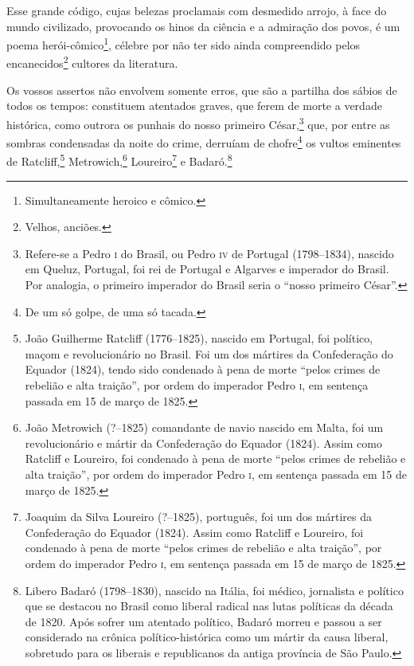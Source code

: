 Esse grande código, cujas belezas proclamais com desmedido arrojo, à
face do mundo civilizado, provocando os hinos da ciência e a admiração
dos povos, é um poema herói-cômico\footnote{Simultaneamente heroico e
  cômico.}, célebre por não ter sido ainda compreendido pelos
encanecidos\footnote{Velhos, anciões.} cultores da literatura.

Os vossos assertos não envolvem somente erros, que são a partilha dos
sábios de todos os tempos: constituem atentados graves, que ferem de
morte a verdade histórica, como outrora os punhais do nosso primeiro
César,\footnote{Refere-se a Pedro \textsc{i} do Brasil, ou Pedro \textsc{iv} de Portugal
  (1798--1834), nascido em Queluz, Portugal, foi rei de Portugal e
  Algarves e imperador do Brasil. Por analogia, o primeiro imperador do
  Brasil seria o ``nosso primeiro César''.} que, por entre as sombras
condensadas da noite do crime, derruíam de chofre\footnote{De um só
  golpe, de uma só tacada.} os vultos eminentes de Ratcliff,\footnote{
  João Guilherme Ratcliff (1776--1825), nascido em Portugal, foi
  político, maçom e revolucionário no Brasil. Foi um dos mártires da
  Confederação do Equador (1824), tendo sido condenado à pena de morte
  ``pelos crimes de rebelião e alta traição'', por ordem do imperador
  Pedro \textsc{i}, em sentença passada em 15 de março de 1825.\label{ratcliff}}
Metrowich,\footnote{João Metrowich (?--1825) comandante de navio
  nascido em Malta, foi um revolucionário e mártir da Confederação do
  Equador (1824). Assim como Ratcliff e Loureiro, foi condenado à pena
  de morte ``pelos crimes de rebelião e alta traição'', por ordem do
  imperador Pedro \textsc{i}, em sentença passada em 15 de março de 1825.}
Loureiro\footnote{Joaquim da Silva Loureiro (?--1825), português, foi
  um dos mártires da Confederação do Equador (1824). Assim como Ratcliff
  e Loureiro, foi condenado à pena de morte ``pelos crimes de rebelião e
  alta traição'', por ordem do imperador Pedro \textsc{i}, em sentença passada em
  15 de março de 1825.} e Badaró.\footnote{Libero Badaró (1798--1830),
  nascido na Itália, foi médico, jornalista e político que se destacou
  no Brasil como liberal radical nas lutas políticas da década de 1820.
  Após sofrer um atentado político, Badaró morreu e passou a ser
  considerado na crônica político-histórica como um mártir da causa
  liberal, sobretudo para os liberais e republicanos da antiga província
  de São Paulo.}

